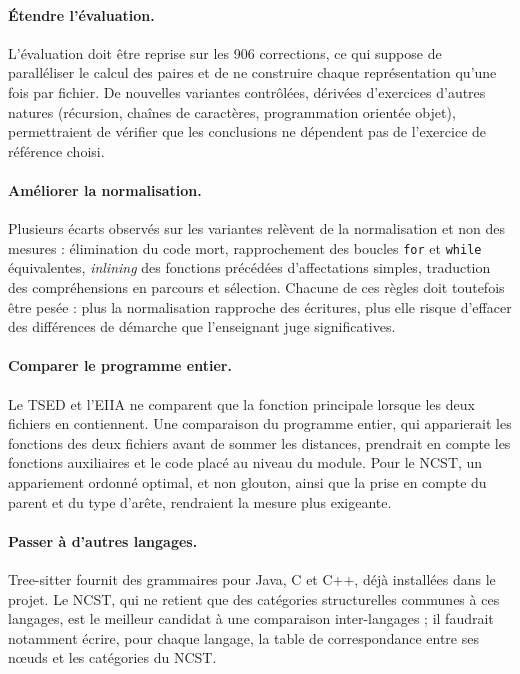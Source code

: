 \documentclass[12pt,a4paper,oneside]{report}
\begin{document}
\paragraph{Étendre l'évaluation.}
L'évaluation doit être reprise sur les 906 corrections, ce qui suppose de
paralléliser le calcul des paires et de ne construire chaque représentation
qu'une fois par fichier. De nouvelles variantes contrôlées, dérivées
d'exercices d'autres natures (récursion, chaînes de caractères,
programmation orientée objet), permettraient de vérifier que les
conclusions ne dépendent pas de l'exercice de référence choisi.

\paragraph{Améliorer la normalisation.}
Plusieurs écarts observés sur les variantes relèvent de la normalisation et
non des mesures : élimination du code mort, rapprochement des boucles
\texttt{for} et \texttt{while} équivalentes, \emph{inlining} des fonctions
précédées d'affectations simples, traduction des compréhensions en
parcours et sélection. Chacune de ces règles doit toutefois être pesée :
plus la normalisation rapproche des écritures, plus elle risque d'effacer
des différences de démarche que l'enseignant juge significatives.

\paragraph{Comparer le programme entier.}
Le TSED et l'EIIA ne comparent que la fonction principale lorsque les deux
fichiers en contiennent. Une comparaison du programme entier, qui
apparierait les fonctions des deux fichiers avant de sommer les
distances, prendrait en compte les fonctions auxiliaires et le code placé
au niveau du module. Pour le NCST, un appariement ordonné optimal, et non
glouton, ainsi que la prise en compte du parent et du type d'arête,
rendraient la mesure plus exigeante.

\paragraph{Passer à d'autres langages.}
Tree-sitter fournit des grammaires pour Java, C et C++, déjà installées
dans le projet. Le NCST, qui ne retient que des catégories structurelles
communes à ces langages, est le meilleur candidat à une comparaison
inter-langages ; il faudrait notamment écrire, pour chaque langage, la
table de correspondance entre ses nœuds et les catégories du NCST.
\end{document}
